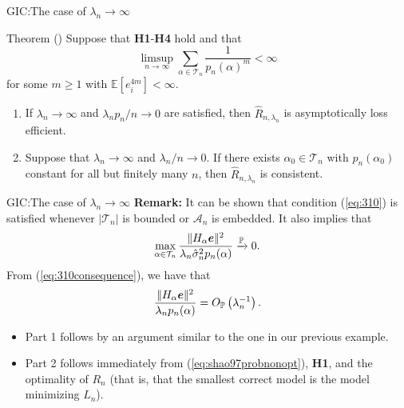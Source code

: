 \documentclass{beamer}
\newcommand{\0}{\emptyset}
\newcommand{\prob}{\mathbb{P}}
\newcommand{\Ep}[1]{\mathbb{E}\left[ #1 \right]}
\newcommand{\paren}[1]{\left(#1 \right)}
\newcommand{\norm}[1]{|\hspace{-1pt}|#1 |\hspace{-1pt}|}
\newcommand{\normsq}[1]{\norm{#1}^{2}}
\newcommand{\Acal}{\mathcal{A}_{n}}
\newcommand{\Tcal}{\mathcal{T}_{n}}
\newcommand{\e}{\boldsymbol{e}}
\newcommand{\Op}[1]{O_{\prob}\paren{#1}}
\newcommand{\sigmahat}{\hat{\sigma}^{2}_{n}}
\newcommand{\1}{\mathmybb{1}}
\begin{document}
\begin{frame}{GIC:\@ The case of \(\lambda_{n} \to \infty\)}
  \begin{block}{Theorem (\cite{shao_1997})}\label{thm:97thm2}
    Suppose that \textbf{H1}-\textbf{H4} hold and that
    \begin{equation}\label{eq:310}
        \limsup_{n\to\infty}\sum_{\alpha\in\Tcal}\frac{1}{p_{n}{(\alpha)}^{m}}<\infty
    \end{equation}
    for some \(m\geq1\) with \(\Ep{e_{i}^{4m}}<\infty\).
    \begin{enumerate}
        \item If \(\lambda_{n}\to\infty\) and \(\lambda_{n}p_{n}/n \to 0\) are satisfied, then \(\hat{R}_{n,\lambda_{n}}\) is asymptotically loss efficient.
        \item Suppose that \(\lambda_{n}\to\infty\) and \(\lambda_{n}/n\to 0\). If there exists \(\alpha_{0}\in\Tcal\) with \(p_{n}(\alpha_{0})\) constant for all but finitely many \(n\), then \(\hat{R}_{n,\lambda_{n}}\) is consistent. 
    \end{enumerate}
  \end{block}
\end{frame}

\begin{frame}{GIC:\@ The case of \(\lambda_{n} \to \infty\)}
  \textbf{Remark: }It can be shown that condition (\ref{eq:310}) is satisfied whenever \(|\Tcal|\) is bounded or \(\Acal\) is embedded. It also implies that 
  \begin{equation}\label{eq:310consequence}
      \max_{\alpha\in\Tcal} \frac{\normsq{H_{\alpha}\e}}{\lambda_{n}\sigmahat p_{n}(\alpha)}\xrightarrow{\prob} 0.
  \end{equation}
  From (\ref{eq:310consequence}), we have that 
    \begin{equation}\label{eq:shao97probnonopt}
        \frac{\normsq{H_{\alpha}\e}}{\lambda_{n}p_{n}(\alpha)} = \Op{\lambda_{n}^{-1}}.
    \end{equation}

  \begin{itemize}
    \item Part 1 follows by an argument similar to the one in our previous example.
    \item Part 2 follows immediately from (\ref{eq:shao97probnonopt}), \textbf{H1}, and the optimality of \(R_{n}\) (that is, that the smallest correct model is the model minimizing \(L_n\)).
  \end{itemize}
\end{frame}
\end{document}
